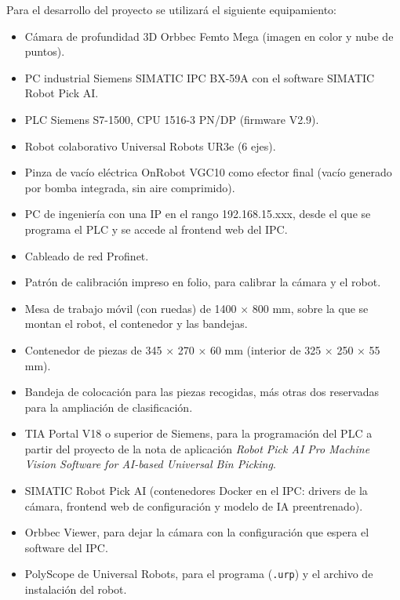Para el desarrollo del proyecto se utilizará el siguiente equipamiento:
\begin{itemize}
	\item Cámara de profundidad 3D Orbbec Femto Mega (imagen en color y nube de puntos).
	\item PC industrial Siemens SIMATIC IPC BX-59A con el software SIMATIC Robot Pick AI.
	\item PLC Siemens S7-1500, CPU 1516-3 PN/DP (firmware V2.9).
	\item Robot colaborativo Universal Robots UR3e (6 ejes).
	\item Pinza de vacío eléctrica OnRobot VGC10 como efector final (vacío generado por bomba integrada, sin aire comprimido).
	\item PC de ingeniería con una IP en el rango 192.168.15.xxx, desde el que se programa el PLC y se accede
	      al frontend web del IPC.
	\item Cableado de red Profinet.
	\item Patrón de calibración impreso en folio, para calibrar la cámara y el robot.
	\item Mesa de trabajo móvil (con ruedas) de 1400 × 800 mm, sobre la que se montan el robot, el contenedor y
	      las bandejas.
	\item Contenedor de piezas de 345 × 270 × 60 mm (interior de 325 × 250 × 55 mm).
	\item Bandeja de colocación para las piezas recogidas, más otras dos reservadas para la ampliación de
	      clasificación.
\end{itemize}

\begin{itemize}
	\item TIA Portal V18 o superior de Siemens, para la programación del PLC a partir del proyecto de la nota de aplicación
	      \textit{Robot Pick AI Pro Machine Vision Software for AI-based Universal Bin Picking}.
	\item SIMATIC Robot Pick AI (contenedores Docker en el IPC: drivers de la cámara, frontend web de
	      configuración y modelo de IA preentrenado).
	\item Orbbec Viewer, para dejar la cámara con la configuración que espera el software del IPC.
	\item PolyScope de Universal Robots, para el programa (\texttt{.urp}) y el archivo de instalación del robot.
\end{itemize}
